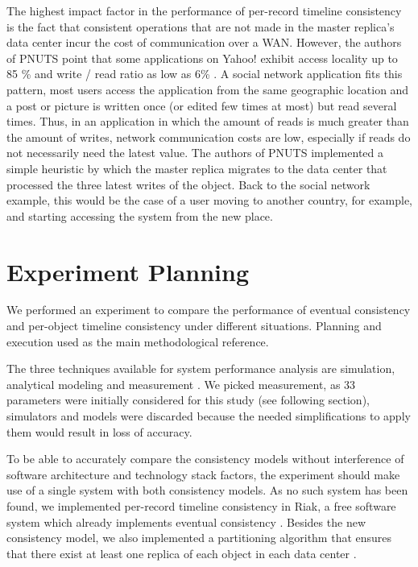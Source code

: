 \documentclass[doublespacing]{bmcart}
\begin{document}
The highest impact factor in the performance of per-record timeline consistency
is the fact that consistent operations that are not made in the master
replica's data center incur the cost of communication over a WAN.  However, the
authors of PNUTS point that some applications on Yahoo! exhibit access locality
up to 85 \% and write / read ratio as low as 6\% \cite{Kadambi2011,
Cooper2008}.  A social network application fits this pattern, most users access
the application from the same geographic location and a post or picture is
written once (or edited few times at most) but read several times. Thus, in an
application in which the amount of reads is much greater than the amount of
writes, network communication costs are low, especially if reads do not
necessarily need the latest value.  The authors of PNUTS implemented a simple
heuristic by which the master replica migrates to the data center that
processed the three latest writes of the object. Back to the social network
example, this would be the case of a user moving to another country, for
example, and starting accessing the system from the new place.

\section{Experiment Planning}

We performed an experiment to compare the performance of eventual consistency
and per-object timeline consistency under different situations. Planning and
execution used \cite{Jain1991} as the main methodological reference.

The three techniques available for system performance analysis are simulation,
analytical modeling and measurement \cite{Jain1991}. We picked measurement, as
33 parameters were initially considered for this study (see following section),
simulators and models were discarded because the needed simplifications to
apply them would result in loss of accuracy.

To be able to accurately compare the consistency models without interference of
software architecture and technology stack factors, the experiment should make
use of a single system with both consistency models. As no such system has been
found, we implemented per-record timeline consistency in Riak, a free software
system which already implements eventual consistency \cite{Riak2013}. Besides
the new consistency model, we also implemented a partitioning algorithm that
ensures that there exist at least one replica of each object in each data
center \cite{DeDiana2013a, DeDiana2013b}.
\end{document}
